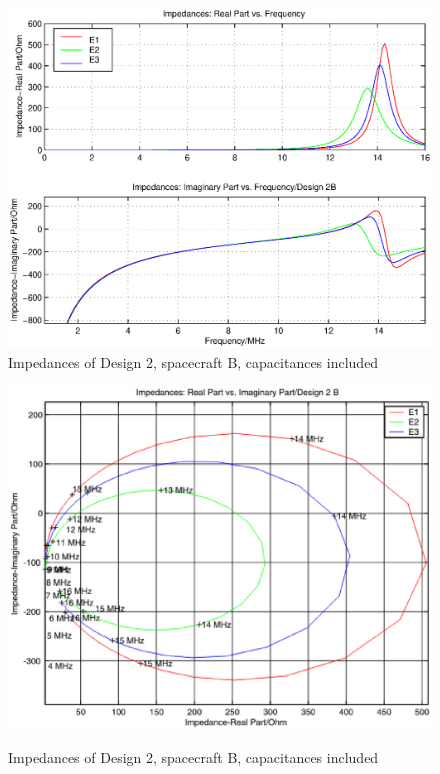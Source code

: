 \documentclass[a4paper,14pt]{extbook}
\begin{document}
\begin{figure}
\begin{center}
\includegraphics[scale=0.65]{ImpedancesD2B1_caps.eps}\\
\caption{Impedances of Design 2, spacecraft B, capacitances included} \label{fig_Impedance1_D2B_caps}
\includegraphics[scale=0.65]{ImpedancesD2B2_caps.eps} \\
\caption{Impedances of Design 2, spacecraft B, capacitances included} \label{fig_Impedance2_D2B_caps}
\end{center}
\end{figure}
\end{document}
